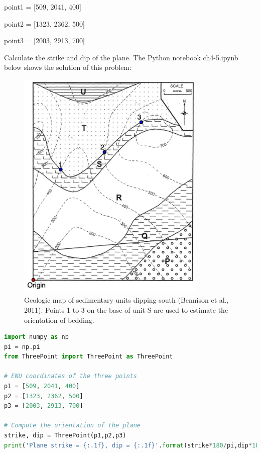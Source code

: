 \documentclass[a4paper , 12pt]{book}
\begin{document}
point1 = [509, 2041, 400]

point2 = [1323, 2362, 500]

point3 = [2003, 2913, 700] 

Calculate the strike and dip of the plane. The Python notebook ch4-5.ipynb below shows the solution of this problem:\\ 

\begin{figure}[ht]
    \centering
    \includegraphics[width=9cm]{Figures/ch4f7.png}
    \caption{Geologic map of sedimentary units dipping south (Bennison et al., 2011). Points 1 to 3 on the base of unit S are used to estimate the orientation of bedding.}
\end{figure}

\begin{center}
\begin{lstlisting}[language=Python, frame=single]
import numpy as np
pi = np.pi
from ThreePoint import ThreePoint as ThreePoint

# ENU coordinates of the three points
p1 = [509, 2041, 400]
p2 = [1323, 2362, 500]
p3 = [2003, 2913, 700]

# Compute the orientation of the plane
strike, dip = ThreePoint(p1,p2,p3)
print('Plane strike = {:.1f}, dip = {:.1f}'.format(strike*180/pi,dip*180/pi))
\end{lstlisting}
\end{center}
\end{document}
